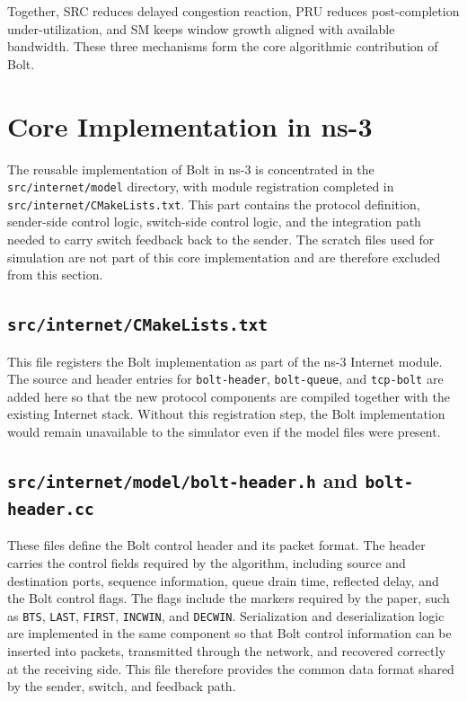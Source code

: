 Together, SRC reduces delayed congestion reaction, PRU reduces post-completion under-utilization, and SM keeps window growth aligned with available bandwidth. These three mechanisms form the core algorithmic contribution of Bolt.

\section{Core Implementation in ns-3}

The reusable implementation of Bolt in ns-3 is concentrated in the \texttt{src/internet/model} directory, with module registration completed in \texttt{src/internet/CMakeLists.txt}. This part contains the protocol definition, sender-side control logic, switch-side control logic, and the integration path needed to carry switch feedback back to the sender. The scratch files used for simulation are not part of this core implementation and are therefore excluded from this section.

\subsection{\texttt{src/internet/CMakeLists.txt}}

This file registers the Bolt implementation as part of the ns-3 Internet module. The source and header entries for \texttt{bolt-header}, \texttt{bolt-queue}, and \texttt{tcp-bolt} are added here so that the new protocol components are compiled together with the existing Internet stack. Without this registration step, the Bolt implementation would remain unavailable to the simulator even if the model files were present.

\subsection{\texttt{src/internet/model/bolt-header.h} and \texttt{bolt-header.cc}}

These files define the Bolt control header and its packet format. The header carries the control fields required by the algorithm, including source and destination ports, sequence information, queue drain time, reflected delay, and the Bolt control flags. The flags include the markers required by the paper, such as \texttt{BTS}, \texttt{LAST}, \texttt{FIRST}, \texttt{INCWIN}, and \texttt{DECWIN}. Serialization and deserialization logic are implemented in the same component so that Bolt control information can be inserted into packets, transmitted through the network, and recovered correctly at the receiving side. This file therefore provides the common data format shared by the sender, switch, and feedback path.

